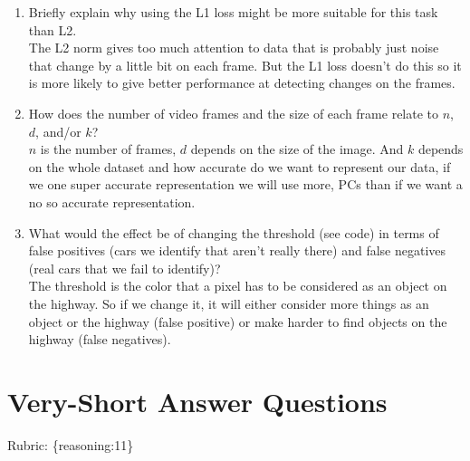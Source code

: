 \documentclass{article}
\def\rubric#1{\gre{Rubric: \{#1\}}}{}
\def\gre#1{{\color{gre}#1}}
\def\ans#1{{\color{ans}#1}}
\def\enum#1{\begin{enumerate}#1\end{enumerate}}
\begin{document}
\enum{
\item Briefly explain why using the L1 loss might be more suitable for this task than L2. \\
\ans{
    The L2 norm gives too much attention to data that is probably just noise that change 
    by a little bit on each frame. But the L1 loss doesn't do this so it is more likely to 
    give better performance at detecting changes on the frames.
}
\item How does the number of video frames and the size of each frame relate to $n$, $d$, and/or $k$? \\
\ans{
    $n$ is the number of frames, $d$ depends on the size of the image. And $k$ 
    depends on the whole dataset and how accurate do we want to represent our 
    data, if we one super accurate representation we will use more, PCs than if we want a no so 
    accurate representation.
}
\item What would the effect be of changing the threshold (see code) in terms of false positives (cars we identify that aren't really there) and false negatives (real cars that we fail to identify)? \\
\ans{
    The threshold is the color that a pixel has to be considered as an object on the highway. So if 
    we change it, it will either consider more things as an object or the highway (false positive) 
    or make harder to find objects on the highway (false negatives).
}
}

\section{Very-Short Answer Questions}
\rubric{reasoning:11}
\end{document}
